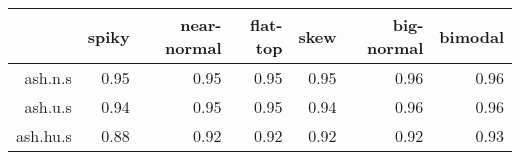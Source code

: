 \begin{tabular}{rrrrrrr}
  \toprule  & spiky & near-normal & flat-top & skew & big-normal & bimodal \\ 
  \midrule ash.n.s & 0.95 & 0.95 & 0.95 & 0.95 & 0.96 & 0.96 \\ 
  ash.u.s & 0.94 & 0.95 & 0.95 & 0.94 & 0.96 & 0.96 \\ 
  ash.hu.s & 0.88 & 0.92 & 0.92 & 0.92 & 0.92 & 0.93 \\ 
   \bottomrule \end{tabular}

